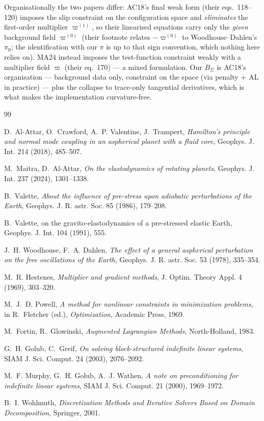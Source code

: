 \documentclass[11pt]{article}
\begin{document}
Organisationally the two papers differ: AC18's final weak form
(their eqs.~118--120) imposes the slip constraint on the configuration
space and \emph{eliminates} the first-order multiplier
$\varpi^{(1)}$, so their linearised equations carry only the
\emph{given} background field $\varpi^{(0)}$ (their footnote relates
$-\varpi^{(0)}$ to Woodhouse--Dahlen's $\pi_0$; the identification
with our $\pi$ is up to that sign convention, which nothing here
relies on). MA24 instead imposes the test-function constraint weakly
with a multiplier field $\varpi$ (their eq.~170) --- a mixed
formulation. Our $B_\Sigma$ is AC18's organisation --- background
data only, constraint on the space (via penalty + AL in practice) ---
plus the collapse to trace-only tangential derivatives, which is what
makes the implementation curvature-free.

\begin{thebibliography}{99}

D.~Al-Attar, O.~Crawford, A.~P. Valentine, J.~Trampert,
\emph{Hamilton's principle and normal mode coupling in an aspherical
planet with a fluid core},
Geophys. J. Int. 214 (2018), 485--507.

M.~Maitra, D.~Al-Attar,
\emph{On the elastodynamics of rotating planets},
Geophys. J. Int. 237 (2024), 1301--1338.

B.~Valette,
\emph{About the influence of pre-stress upon adiabatic perturbations of
the Earth},
Geophys. J. R. astr. Soc. 85 (1986), 179--208.

B.~Valette, on the gravito-elastodynamics of a pre-stressed elastic
Earth, Geophys. J. Int. 104 (1991), 555.

J.~H. Woodhouse, F.~A. Dahlen,
\emph{The effect of a general aspherical perturbation on the free
oscillations of the Earth},
Geophys. J. R. astr. Soc. 53 (1978), 335--354.

M.~R. Hestenes,
\emph{Multiplier and gradient methods},
J. Optim. Theory Appl. 4 (1969), 303--320.

M.~J.~D. Powell,
\emph{A method for nonlinear constraints in minimization problems},
in R.~Fletcher (ed.), \emph{Optimization}, Academic Press, 1969.

M.~Fortin, R.~Glowinski,
\emph{Augmented Lagrangian Methods},
North-Holland, 1983.

G.~H. Golub, C.~Greif,
\emph{On solving block-structured indefinite linear systems},
SIAM J. Sci. Comput. 24 (2003), 2076--2092.

M.~F. Murphy, G.~H. Golub, A.~J. Wathen,
\emph{A note on preconditioning for indefinite linear systems},
SIAM J. Sci. Comput. 21 (2000), 1969--1972.

B.~I. Wohlmuth,
\emph{Discretization Methods and Iterative Solvers Based on Domain
Decomposition},
Springer, 2001.

\end{thebibliography}
\end{document}
